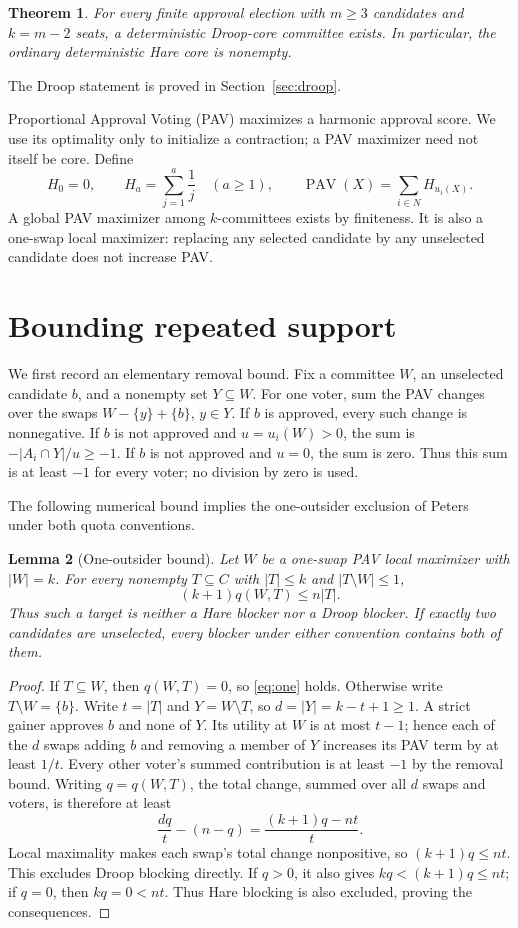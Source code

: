 \documentclass[11pt]{article}
\newtheorem{theorem}{Theorem}
\newtheorem{lemma}[theorem]{Lemma}
\newcommand{\PAV}{\operatorname{PAV}}
\begin{document}
\begin{theorem}\label{thm:main}
For every finite approval election with $m\ge3$ candidates and $k=m-2$ seats,
a deterministic Droop-core committee exists. In particular, the
ordinary deterministic Hare core is nonempty.
\end{theorem}
The Droop statement is proved in Section~\ref{sec:droop}.

Proportional Approval Voting (PAV) maximizes a harmonic approval score.
We use its optimality only to initialize a contraction; a PAV maximizer
need not itself be core. Define
\[
 H_0=0,\qquad H_a=\sum_{j=1}^a\frac1j\quad(a\ge1),\qquad
 \PAV(X)=\sum_{i\in N}H_{u_i(X)}.
\]
A global PAV maximizer among $k$-committees exists by finiteness. It is also
a one-swap local maximizer: replacing any selected candidate by any
unselected candidate does not increase PAV.

\section{Bounding repeated support}\label{sec:repeat}
We first record an elementary removal bound. Fix a committee $W$, an
unselected candidate $b$, and a nonempty set $Y\subseteq W$. For one voter,
sum the PAV changes over the swaps $W-\{y\}+\{b\}$, $y\in Y$. If $b$ is
approved, every such change is nonnegative. If $b$ is not approved and
$u=u_i(W)>0$, the sum is $-|A_i\cap Y|/u\ge-1$. If $b$ is not approved
and $u=0$, the sum is zero.
Thus this sum is at least $-1$ for every voter; no division by zero is used.

The following numerical bound implies the one-outsider exclusion of
Peters~\cite[Lemma~3.1(ii)]{Peters2025} under both quota conventions.

\begin{lemma}[One-outsider bound]\label{lem:one}
Let $W$ be a one-swap PAV local maximizer with $|W|=k$.
For every nonempty $T\subseteq C$ with $|T|\le k$ and
$|T\setminus W|\le1$,
\begin{equation}\label{eq:one}
 (k+1)q(W,T)\le n|T|.
\end{equation}
Thus such a target is neither a Hare blocker nor a Droop blocker.
If exactly two candidates are unselected, every blocker under either
convention contains both of them.
\end{lemma}
\begin{proof}
If $T\subseteq W$, then $q(W,T)=0$, so \eqref{eq:one} holds.
Otherwise write $T\setminus W=\{b\}$.
Write $t=|T|$ and $Y=W\setminus T$, so $d=|Y|=k-t+1\ge1$. A strict gainer
approves $b$ and none of $Y$. Its utility at $W$ is at most $t-1$; hence
each of the $d$ swaps adding $b$ and removing a member of $Y$ increases its
PAV term by at least $1/t$. Every other voter's summed contribution is at
least $-1$ by the removal bound. Writing $q=q(W,T)$, the total change,
summed over all $d$ swaps and voters, is therefore at least
\[
 \frac{dq}{t}-(n-q)=\frac{(k+1)q-nt}{t}.
\]
Local maximality makes each swap's total change nonpositive, so
$(k+1)q\le nt$. This excludes Droop blocking directly.
If $q>0$, it also gives $kq<(k+1)q\le nt$; if $q=0$, then
$kq=0<nt$. Thus Hare blocking is also excluded, proving the consequences.
\end{proof}
\end{document}
